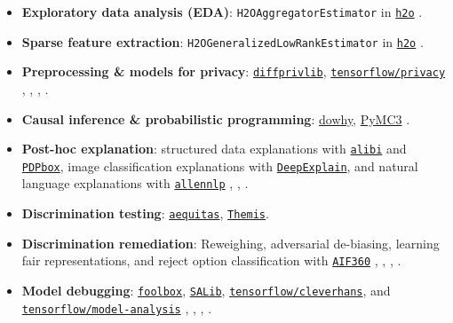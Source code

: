 \documentclass[information,article,submit,moreauthors,pdftex]{definitions/mdpi}
\begin{document}
\begin{itemize}[leftmargin=*,labelsep=5.8mm]

\item \textbf{Exploratory data analysis (EDA)}: \texttt{H2OAggregatorEstimator} in \href{http://docs.h2o.ai/h2o/latest-stable/h2o-py/docs/modeling.html#h2oaggregatorestimator}{\texttt{h2o}} \cite{wilkinson2018visualizing}.

\item \textbf{Sparse feature extraction}: \texttt{H2OGeneralizedLowRankEstimator} in \href{http://docs.h2o.ai/h2o/latest-stable/h2o-py/docs/modeling.html#h2ogeneralizedlowrankestimator}{\texttt{h2o}} \cite{udell2016generalized}.

\item \textbf{Preprocessing \& models for privacy}: \href{https://github.com/IBM/differential-privacy-library}{\texttt{diffprivlib}}, \href{https://github.com/tensorflow/privacy/}{\texttt{tensorflow/privacy}} \cite{diffprivlib}, \cite{ji2014differential}, \cite{pate}, \cite{abadi2016deep}.

\item \textbf{Causal inference \& probabilistic programming}: \href{https://github.com/microsoft/dowhy}{dowhy}, \href{https://docs.pymc.io/}{PyMC3} \cite{book_of_why}.

\item \textbf{Post-hoc explanation}: structured data explanations with \href{https://github.com/SeldonIO/alibi}{\texttt{alibi}} and \href{https://github.com/SauceCat/PDPbox}{\texttt{PDPbox}}, image classification explanations with \href{https://github.com/marcoancona/DeepExplain}{\texttt{DeepExplain}}, and natural language explanations with \href{https://github.com/allenai/allennlp}{\texttt{allennlp}} \cite{wachter2017counterfactual}, \cite{grad_attr}, \cite{wallace2019allennlp}. 

\item \textbf{Discrimination testing}: \href{https://github.com/dssg/aequitas}{\texttt{aequitas}}, \href{https://github.com/LASER-UMASS/Themis}{\texttt{Themis}}.

\item \textbf{Discrimination remediation}: Reweighing, adversarial de-biasing, learning fair representations, and reject option classification with \href{http://aif360.mybluemix.net/}{\texttt{AIF360}} \cite{kamiran2012data}, \cite{zhang2018mitigating}, \cite{lfr}, \cite{kamiran2012decision}.

\item \textbf{Model debugging}: \href{https://github.com/bethgelab/foolbox}{\texttt{foolbox}}, \href{https://github.com/SALib/SALib}{\texttt{SALib}}, \href{https://github.com/tensorflow/cleverhans}{\texttt{tensorflow/cleverhans}}, and \href{https://github.com/tensorflow/model-analysis}{\texttt{tensorflow/model-analysis}} \cite{rauber2017foolbox}, \cite{papernot2018cleverhans}, \cite{modeltracker}, \cite{papernot2018marauder}.


\end{itemize}
\end{document}
